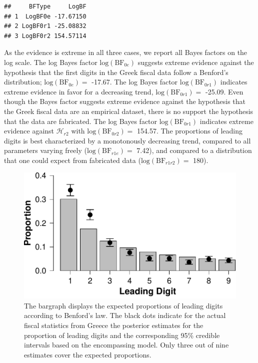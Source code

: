 \documentclass[
  english,
  man,floatsintext]{apa6}
\begin{document}
\begin{verbatim}
##     BFType     LogBF
## 1  LogBF0e -17.67150
## 2 LogBF0r1 -25.08832
## 3 LogBF0r2 154.57114
\end{verbatim}

As the evidence is extreme in all three cases, we report all Bayes factors on the log scale. The log Bayes factor \(\text{log}(\text{BF}_{0e})\) suggests extreme evidence against the hypothesis that the first digits in the Greek fiscal data follow a Benford's distribution; \(\text{log}(\text{BF}_{0e}) =\) -17.67. The log Bayes factor \(\text{log}(\text{BF}_{0r1})\) indicates extreme evidence in favor for a decreasing trend, \(\text{log}(\text{BF}_{0r1}) =\) -25.09. Even though the Bayes factor suggests extreme evidence against the hypothesis that the Greek fiscal data are an empirical dataset, there is no support the hypothesis that the data are fabricated. The log Bayes factor \(\text{log}(\text{BF}_{0r1})\) indicates extreme evidence against \(\mathcal{H}_{r2}\) with \(\text{log}(\text{BF}_{0r2}) =\) 154.57. The proportions of leading digits is best characterized by a monotonously decreasing trend, compared to all parameters varying freely (\(\text{log}(\text{BF}_{r1e}) =\) 7.42), and compared to a distribution that one could expect from fabricated data (\(\text{log}(\text{BF}_{r1r2}) =\) 180).



\begin{figure}
\centering
\includegraphics{Rpackage_paper_files/figure-latex/benford-1.pdf}
\caption{\label{fig:benford}The bargraph displays the expected proportions of leading digits according to Benford's law. The black dots indicate for the actual fiscal statistics from Greece the posterior estimates for the proportion of leading digits and the corresponding 95\% credible intervals based on the encompassing model. Only three out of nine estimates cover the expected proportions.}
\end{figure}
\end{document}
